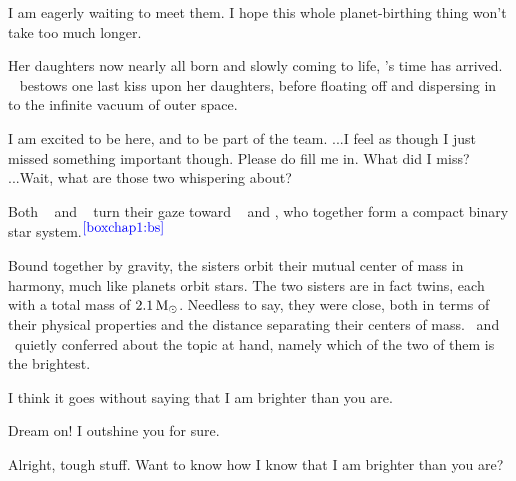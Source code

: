 \documentclass[main.tex]{subfiles}
\begin{document}
\par \Electra I am eagerly waiting to meet them.  I hope this whole planet-birthing thing won't take too much longer.


\par \nar Her daughters now nearly all born and slowly coming to life, \rmpleione's time has arrived. \rmpleione~ bestows one last kiss upon her daughters, before floating off and dispersing in to the infinite vacuum of outer space.

\par \Electra I am excited to be here, and to be part of the team. ...I feel as though I just missed something important though.  Please do fill me in.  What did I miss?  ...Wait, what are those two whispering about?

\par \nar Both \rmmaia~ and \rmelectra~ turn their gaze toward \rmtaygete~ and \rmalcyone, who together form a compact binary star system.$^{\textcolor{blue}{{\ref{boxchap1:bs}}}}$

\par \nar Bound together by gravity, the sisters orbit their mutual center of mass in harmony, much like planets orbit stars.  The two sisters are in fact twins, each with a total mass of $2.1\,\mathrm{M}_\odot$.  Needless to say, they were close, both in terms of their physical properties and the distance separating their centers of mass.  \rmtaygete~and \rmalcyone~quietly conferred about the topic at hand, namely which of the two of them is the brightest.


\par \Taygete I think it goes without saying that I am brighter than you are.

\par \Alcyone Dream on!  I outshine you for sure.

\par \Taygete Alright, tough stuff.  Want to know how I know that I am brighter than you are?
\end{document}
